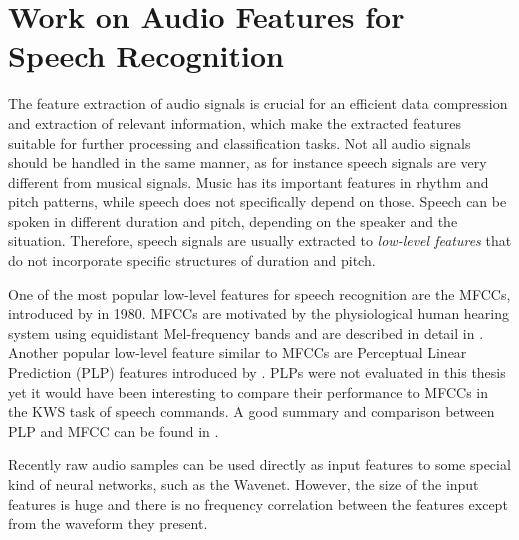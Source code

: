 
\section{Work on Audio Features for Speech Recognition}\label{sec:prev_features}
The feature extraction of audio signals is crucial for an efficient data compression and extraction of relevant information, which make the extracted features suitable for further processing and classification tasks.
Not all audio signals should be handled in the same manner, as for instance speech signals are very different from musical signals.
Music has its important features in rhythm and pitch patterns, while speech does not specifically depend on those.
Speech can be spoken in different duration and pitch, depending on the speaker and the situation.
Therefore, speech signals are usually extracted to \emph{low-level features} that do not incorporate specific structures of duration and pitch.

One of the most popular low-level features for speech recognition are the MFCCs, introduced by \cite{Mermelstein1980} in 1980.
MFCCs are motivated by the physiological human hearing system using equidistant Mel-frequency bands and are described in detail in .
Another popular low-level feature similar to MFCCs are Perceptual Linear Prediction (PLP) features introduced by \cite{Hermansky1987}.
PLPs were not evaluated in this thesis yet it would have been interesting to compare their performance to MFCCs in the KWS task of speech commands.
A good summary and comparison between PLP and MFCC can be found in \cite{Hoenig2005}.

Recently raw audio samples can be used directly as input features to some special kind of neural networks, such as the Wavenet. 
However, the size of the input features is huge and there is no frequency correlation between the features except from the waveform they present.